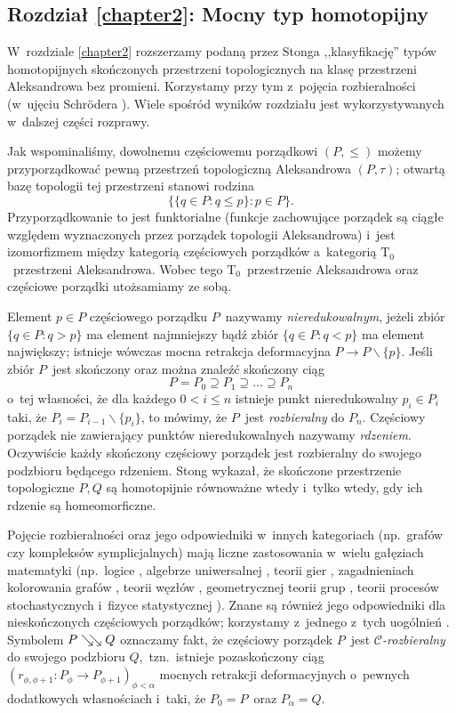 \subsection*{Rozdział \ref{chapter2}: Mocny typ homotopijny}
W~rozdziale \ref{chapter2} rozszerzamy podaną przez Stonga \cite{Stong66} ,,klasyfikację'' typów homotopijnych skończonych przestrzeni topologicznych na klasę przestrzeni Aleksandrowa bez promieni. Korzystamy przy tym z~pojęcia rozbieralności (w~ujęciu Schr{\"o}dera \cite{Schroder99}). Wiele spośród wyników rozdziału jest wykorzystywanych w~dalszej części rozprawy.

Jak wspominaliśmy, dowolnemu częściowemu porządkowi $(P,\leq)$ możemy przyporządkować pewną przestrzeń topologiczną Aleksandrowa $(P,\tau)$; otwartą bazę topologii tej przestrzeni stanowi rodzina \[\bigl\{ \{q\in P:q\leq p\}:p\in P\bigr\}.\] Przyporządkowanie to jest funktorialne (funkcje zachowujące porządek są ciągłe względem wyznaczonych przez porządek topologii Aleksandrowa) i~jest izomorfizmem między kategorią częściowych porządków a~kategorią $\mathrm{T_0}$~przestrzeni Aleksandrowa. Wobec tego $\mathrm{T_0}$~przestrzenie Aleksandrowa oraz częściowe porządki utożsamiamy ze sobą.

Element $p\in P$ częściowego porządku $P$~nazywamy \textit{nieredukowalnym}, jeżeli zbiór $\{q\in P:q>p\}$ ma element najmniejszy bądź zbiór $\{q\in P:q<p\}$ ma element największy; istnieje wówczas mocna retrakcja deformacyjna \mbox{$P\to P\smallsetminus\{p\}$}. Jeśli zbiór $P$~jest skończony oraz można znaleźć skończony ciąg \[P=P_0\supseteq P_1\supseteq\ldots \supseteq P_n\] o~tej własności, że dla każdego $0<i\leq n$ istnieje punkt nieredukowalny $p_i\in P_i$ taki, że $P_i=P_{i-1}\smallsetminus\{p_i\}$, to mówimy, że $P$~jest \textit{rozbieralny} do $P_n$. Częściowy porządek nie zawierający punktów nieredukowalnych nazywamy \textit{rdzeniem}. Oczywiście każdy skończony częściowy porządek jest rozbieralny do swojego podzbioru będącego rdzeniem. Stong \cite[Theorem 4]{Stong66} wykazał, że skończone przestrzenie topologiczne $P,Q$ są homotopijnie równoważne wtedy i~tylko wtedy, gdy ich rdzenie są homeomorficzne.

Pojęcie rozbieralności oraz jego odpowiedniki w~innych kategoriach (np.~grafów czy kompleksów symplicjalnych) mają liczne zastosowania w~wielu gałęziach matematyki (np.~logice \cite{Larose07}, algebrze uniwersalnej \cite{Larose05,Larose97}, teorii gier \cite{Nowakowski83}, zagadnieniach kolorowania grafów \cite{Civan07}, teorii węzłów \cite{Przytycki12}, geometrycznej teorii grup \cite{Chepoi14,Hensel14}, teorii procesów stochastycznych i~fizyce statystycznej \cite{Brightwell00,Dyer04}). Znane są również jego odpowiedniki dla nieskończonych częściowych porządków; korzystamy z~jednego z~tych uogólnień \cite{Schroder99}. Symbolem $P\searrow\!\!\searrow Q$ oznaczamy fakt, że częściowy porządek $P$~jest \textit{$\mathcal{C}$-rozbieralny} do swojego podzbioru $Q$,~tzn.~istnieje pozaskończony ciąg $\left(r_{\phi,\phi+1}\colon P_\phi\to P_{\phi+1}\right)_{\phi<\alpha}$ mocnych retrakcji deformacyjnych o~pewnych dodatkowych własnościach i~taki, że \mbox{$P_0=P$}~oraz $P_\alpha=Q$. 


